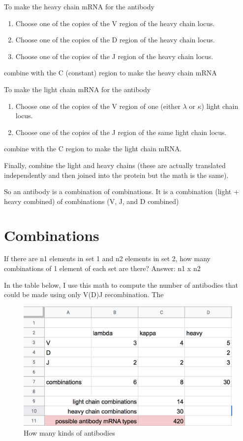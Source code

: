 \documentclass[]{book}
\begin{document}
To make the heavy chain mRNA for the antibody

\begin{enumerate}
\def\labelenumi{\arabic{enumi}.}
\item
  Choose one of the copies of the V region of the heavy chain locus.
\item
  Choose one of the copies of the D region of the heavy chain locus.
\item
  Choose one of the copies of the J region of the heavy chain locus.
\end{enumerate}

combine with the C (constant) region to make the heavy chain mRNA

To make the light chain mRNA for the antibody

\begin{enumerate}
\def\labelenumi{\arabic{enumi}.}
\item
  Choose one of the copies of the V region of one (either \(\lambda\) or
  \(\kappa\)) light chain locus.
\item
  Choose one of the copies of the J region of the same light chain
  locus.
\end{enumerate}

combine with the C region to make the light chain mRNA.

Finally, combine the light and heavy chains (these are actually
translated independently and then joined into the protein but the math
is the same).

So an antibody is a combination of combinations. It is a combination
(light + heavy combined) of combinations (V, J, and D combined)

\section{Combinations}\label{combinations}

If there are n1 elements in set 1 and n2 elements in set 2, how many
combinations of 1 element of each set are there? Answer: n1 x n2

In the table below, I use this math to compute the number of antibodies
that could be made using only V(D)J recombination. The

\begin{figure}

{\centering \includegraphics[width=0.8\linewidth]{images/vdj} 

}

\caption{How many kinds of antibodies}\label{fig:vdj}
\end{figure}
\end{document}
